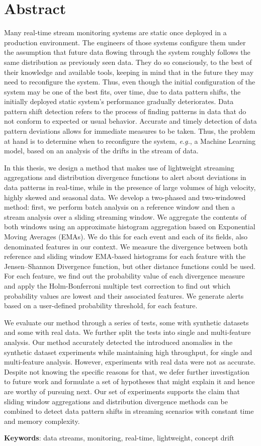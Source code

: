\chapter*{Abstract}

Many real-time stream monitoring systems are static once deployed in a production environment. The engineers of those systems configure them under the assumption that future data flowing through the system roughly follows the same distribution as previously seen data. They do so consciously, to the best of their knowledge and available tools, keeping in mind that in the future they may need to reconfigure the system. Thus, even though the initial configuration of the system may be one of the best fits, over time, due to data pattern shifts, the initially deployed static system's performance gradually deteriorates. Data pattern shift detection refers to the process of finding patterns in data that do not conform to expected or usual behavior. Accurate and timely detection of data pattern deviations allows for immediate measures to be taken. Thus, the problem at hand is to determine when to reconfigure the system, \textit{e.g.}, a Machine Learning model, based on an analysis of the drifts in the stream of data.

In this thesis, we design a method that makes use of lightweight streaming aggregations and distribution divergence functions to alert about deviations in data patterns in real-time, while in the presence of large volumes of high velocity, highly skewed and seasonal data. We develop a two-phased and two-windowed method: first, we perform batch analysis on a reference window and then a stream analysis over a sliding streaming window. We aggregate the contents of both windows using an approximate histogram aggregation based on Exponential Moving Averages (EMAs). We do this for each event and each of its fields, also denominated features in our context. We measure the divergence between both reference and sliding window EMA-based histograms for each feature with the Jensen–Shannon Divergence function, but other distance functions could be used. For each feature, we find out the probability value of each divergence measure and apply the Holm-Bonferroni multiple test correction to find out which probability values are lowest and their associated features. We generate alerts based on a user-defined probability threshold, for each feature.

We evaluate our method through a series of tests, some with synthetic datasets and some with real data. We further split the tests into single and multi-feature analysis. Our method accurately detected the introduced anomalies in the synthetic dataset experiments while maintaining high throughput, for single and multi-feature analysis. However, experiments with real data were not as accurate. Despite not knowing the specific reasons for that, we defer further investigation to future work and formulate a set of hypotheses that might explain it and hence are worthy of pursuing next. Our set of experiments supports the claim that sliding window aggregations and distribution divergence methods can be combined to detect data pattern shifts in streaming scenarios with constant time and memory complexity.

\vspace*{10mm}\noindent
\textbf{Keywords}: data streams, monitoring, real-time, lightweight, concept drift

